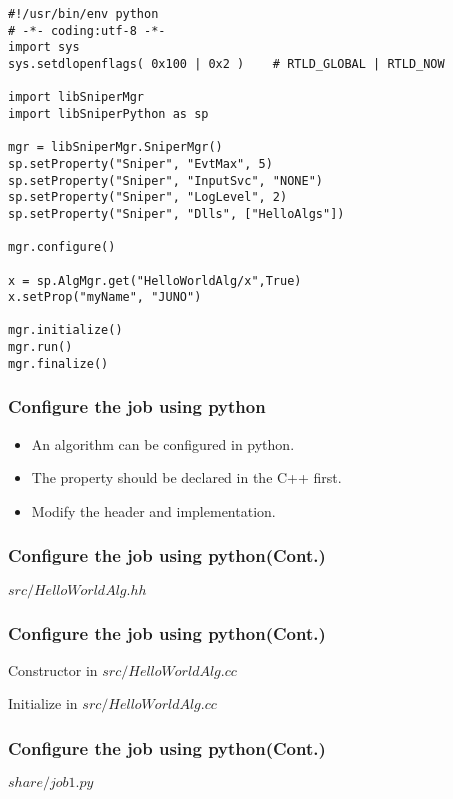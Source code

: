 \begin{lrbox}{\createalgproppy}
\begin{lstlisting}[linebackgroundcolor={\ifnum\value{lstnumber}=18\color{green}\fi}]
#!/usr/bin/env python
# -*- coding:utf-8 -*-
import sys
sys.setdlopenflags( 0x100 | 0x2 )    # RTLD_GLOBAL | RTLD_NOW

import libSniperMgr
import libSniperPython as sp

mgr = libSniperMgr.SniperMgr()
sp.setProperty("Sniper", "EvtMax", 5)
sp.setProperty("Sniper", "InputSvc", "NONE")
sp.setProperty("Sniper", "LogLevel", 2)
sp.setProperty("Sniper", "Dlls", ["HelloAlgs"])

mgr.configure()

x = sp.AlgMgr.get("HelloWorldAlg/x",True)
x.setProp("myName", "JUNO")

mgr.initialize()
mgr.run()
mgr.finalize()
\end{lstlisting}
\end{lrbox}


\begin{frame}
    \frametitle{Configure the job using python}
    \begin{itemize}
        \item An algorithm can be configured in python.
        \item The property should be declared in the C++ first.
        \item Modify the header and implementation.
    \end{itemize}
\end{frame}

\begin{frame}
    \frametitle{Configure the job using python(Cont.)}
    \begin{block}{\(src/HelloWorldAlg.hh\)}
        \par\usebox{\createalgpropheader}
    \end{block}
\end{frame}
\begin{frame}
    \frametitle{Configure the job using python(Cont.)}
    \begin{block}{Constructor in \(src/HelloWorldAlg.cc\)}
        \par\usebox{\createalgpropsrcctor}
    \end{block}
    \begin{block}{Initialize in \(src/HelloWorldAlg.cc\)}
        \par\usebox{\createalgpropsrcexecute}
    \end{block}
\end{frame}
\begin{frame}
    \frametitle{Configure the job using python(Cont.)}
    \begin{block}{\(share/job1.py\)}
        \par\usebox{\createalgproppy}
    \end{block}
\end{frame}

